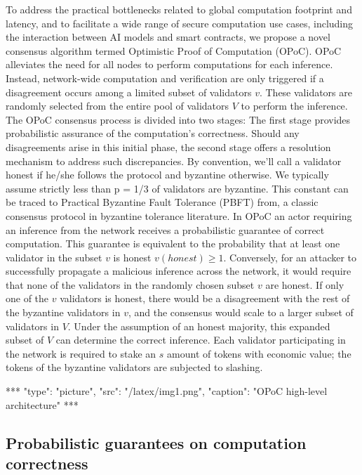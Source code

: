 \documentclass{article}
\begin{document}
To address the practical bottlenecks related to global computation footprint and latency, and to facilitate a wide range of secure computation use cases, including the interaction between AI models and smart contracts, we propose a novel consensus algorithm termed Optimistic Proof of Computation (OPoC).
OPoC alleviates the need for all nodes to perform computations for each inference. Instead, network-wide computation and verification are only triggered if a disagreement occurs among a limited subset of validators \( v \). These validators are randomly selected from the entire pool of validators \( V \) to perform the inference. The OPoC consensus process is divided into two stages: The first stage provides probabilistic assurance of the computation's correctness. Should any disagreements arise in this initial phase, the second stage offers a resolution mechanism to address such discrepancies.
By convention, we’ll call a validator honest if he/she follows the protocol and byzantine otherwise. We typically assume strictly less than p = 1/3 of validators are byzantine. This constant can be traced to Practical Byzantine Fault Tolerance (PBFT) from, a classic consensus protocol in byzantine tolerance literature.
In OPoC an actor requiring an inference from the network receives a probabilistic guarantee of correct computation. This guarantee is equivalent to the probability that at least one validator in the subset \( v \) is honest \( v(honest) \geq 1 \). Conversely, for an attacker to successfully propagate a malicious inference across the network, it would require that none of the validators in the randomly chosen subset \( v \) are honest. If only one of the \( v \) validators is honest, there would be a disagreement with the rest of the byzantine validators in \( v \),  and the consensus would scale to a larger subset of validators in \( V \). Under the assumption of an honest majority, this expanded subset of \( V \) can determine the correct inference. Each validator participating in the network is required to stake an \( s \) amount of tokens with economic value; the tokens of the byzantine validators are subjected to slashing.


***
"type": "picture",
"src": "/latex/img1.png",
"caption": "OPoC high-level architecture"
***


\subsection{Probabilistic guarantees on computation correctness}
\end{document}
